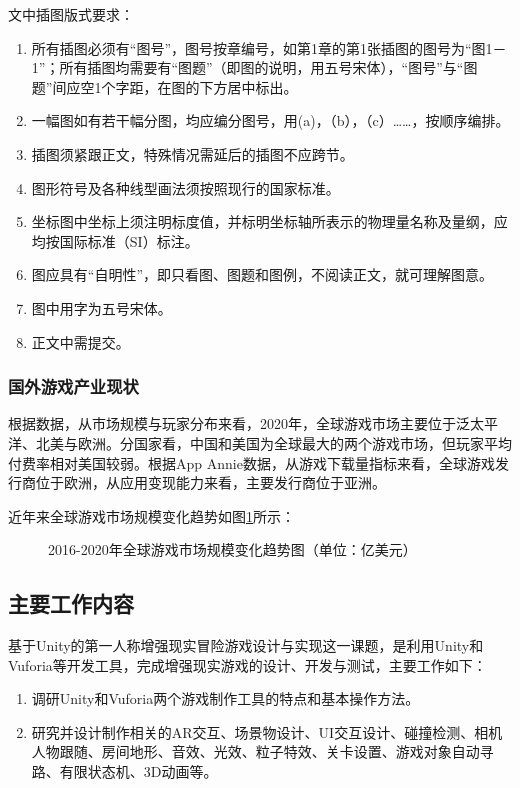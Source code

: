 \documentclass[12pt]{graduate-design-manual}
\begin{document}
文中插图版式要求：
\begin{enumerate}
    \item 所有插图必须有“图号”，图号按章编号，如第1章的第1张插图的图号为“图1－1”；所有插图均需要有“图题”（即图的说明，用五号宋体），“图号”与“图题”间应空1个字距，在图的下方居中标出。
    \item 一幅图如有若干幅分图，均应编分图号，用(a)，（b），（c）……，按顺序编排。
    \item 插图须紧跟正文，特殊情况需延后的插图不应跨节。
    \item 图形符号及各种线型画法须按照现行的国家标准。
    \item 坐标图中坐标上须注明标度值，并标明坐标轴所表示的物理量名称及量纲，应均按国际标准（SI）标注。
    \item 图应具有“自明性”，即只看图、图题和图例，不阅读正文，就可理解图意。
    \item 图中用字为五号宋体。
    \item 正文中需提交。
\end{enumerate}

\subsubsection{国外游戏产业现状}
根据数据，从市场规模与玩家分布来看，2020年，全球游戏市场主要位于泛太平洋、北美与欧洲。分国家看，中国和美国为全球最大的两个游戏市场，但玩家平均付费率相对美国较弱。根据App Annie数据，从游戏下载量指标来看，全球游戏发行商位于欧洲，从应用变现能力来看，主要发行商位于亚洲\cite{jin2020ar}。

近年来全球游戏市场规模变化趋势如图\ref{fig:global-game-market}所示：

\begin{figure}[H]
    \centering
    \caption{2016-2020年全球游戏市场规模变化趋势图（单位：亿美元）}
    \label{fig:global-game-market}
\end{figure}

\subsection{主要工作内容}
基于Unity的第一人称增强现实冒险游戏设计与实现这一课题，是利用Unity和Vuforia等开发工具，完成增强现实游戏的设计、开发与测试，主要工作如下：
\begin{enumerate}
    \item 调研Unity和Vuforia两个游戏制作工具的特点和基本操作方法。
    \item 研究并设计制作相关的AR交互、场景物设计、UI交互设计、碰撞检测、相机人物跟随、房间地形、音效、光效、粒子特效、关卡设置、游戏对象自动寻路、有限状态机、3D动画等。
\end{enumerate}
\end{document}

